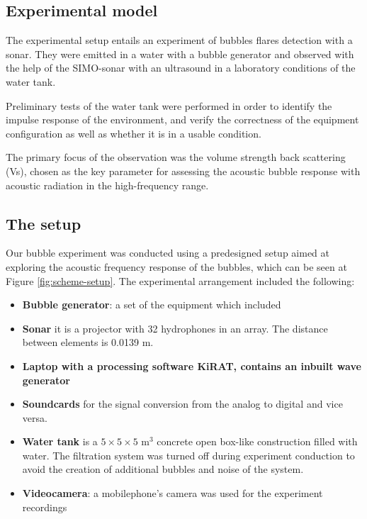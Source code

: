 \subsection{Experimental model}

The experimental setup entails an experiment of bubbles flares detection with a sonar. They were emitted in a water with a bubble generator and observed with the help of the SIMO-sonar with an ultrasound in a laboratory conditions of the water tank. 

Preliminary tests of the water tank were performed in order to identify the impulse response of the  environment, and verify the correctness of the equipment configuration as well as whether it is in a usable condition.

The primary focus of the observation was the volume strength back scattering (Vs), chosen as the key parameter for assessing the acoustic bubble response with acoustic radiation in the high-frequency range. 

\subsection{ The setup}

Our bubble experiment was conducted using a predesigned setup aimed at exploring the acoustic frequency response of the bubbles, which can be seen at Figure \ref*{fig:scheme-setup}. The experimental arrangement included the following:
\begin{itemize}
    \item \textbf{Bubble generator}: a set of the equipment which included
    \item \textbf{Sonar} it is a projector with 32 hydrophones in an array. The distance between elements is 0.0139 m.
    \item \textbf{Laptop with a processing software KiRAT, contains an inbuilt wave generator}
    \item \textbf{Soundcards} for the signal conversion from the analog to digital and vice versa.
    \item \textbf{Water tank} is a $5\times5\times5$ m$^3$ concrete open box-like construction filled with water. The filtration system was turned off during experiment conduction to avoid the creation of additional bubbles and noise of the system.
    \item \textbf{Videocamera}: a mobilephone's camera was used for the experiment recordings
\end{itemize}

